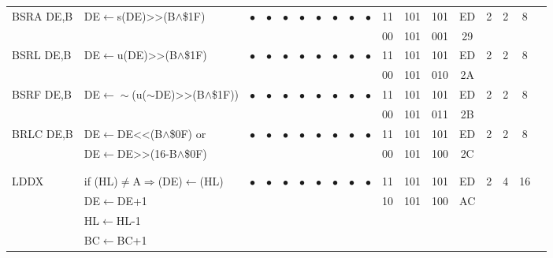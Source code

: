 \documentclass[oneside,a4paper]{book}
\newcommand{\instrt}{\rule{0pt}{2.7ex}}
\newcommand{\instrb}{\rule[-1.7ex]{0pt}{0pt}}
\begin{document}
{\begin{tabular}{llcccccccccccccccl}
		BSRA DE,B\footnotemark[1]\instrt & 
			DE$\leftarrow$s(DE)>>(B$\wedge$\$1F)\footnotemark[2] & 
			$\bullet$ & 
				$\bullet$ & 
				$\bullet$ & 
				$\bullet$ & 
				$\bullet$ & 
				$\bullet$ & 
				$\bullet$ & 
				$\bullet$ & 
			11 & 101 & 101 & 
			ED & 2 & 
			2 & 8 & \\
			\multicolumn{10}{c}{} & 00 & 101 & 001 & 29 & \instrb \\

		BSRL DE,B\footnotemark[1]\instrt & 
			DE$\leftarrow$u(DE)>>(B$\wedge$\$1F)\footnotemark[3] & 
			$\bullet$ & 
				$\bullet$ & 
				$\bullet$ & 
				$\bullet$ & 
				$\bullet$ & 
				$\bullet$ & 
				$\bullet$ & 
				$\bullet$ & 
			11 & 101 & 101 & 
			ED & 2 & 
			2 & 8 & \\
			\multicolumn{10}{c}{} & 00 & 101 & 010 & 2A & \instrb \\

		BSRF DE,B\footnotemark[1]\instrt & 
			DE$\leftarrow\sim$(u($\sim$DE)>>(B$\wedge$\$1F))\footnotemark[4] & 
			$\bullet$ & 
				$\bullet$ & 
				$\bullet$ & 
				$\bullet$ & 
				$\bullet$ & 
				$\bullet$ & 
				$\bullet$ & 
				$\bullet$ & 
			11 & 101 & 101 & 
			ED & 2 & 
			2 & 8 & \\
			\multicolumn{10}{c}{} & 00 & 101 & 011 & 2B & \instrb \\
			
		BRLC DE,B\footnotemark[1]\instrt & 
			DE$\leftarrow$DE<<(B$\wedge$\$0F) or & 
			$\bullet$ & 
				$\bullet$ & 
				$\bullet$ & 
				$\bullet$ & 
				$\bullet$ & 
				$\bullet$ & 
				$\bullet$ & 
				$\bullet$ & 
			11 & 101 & 101 & 
			ED & 2 & 
			2 & 8 & \\
			& DE$\leftarrow$DE>>(16-B$\wedge$\$0F) & \multicolumn{8}{c}{} & 00 & 101 & 100 & 2C & \instrb \\

		& & & & & & & & & & & & & & & & & \\
		& & & & & & & & & & & & & & & & & \\
	
		LDDX\instrt & 
			if (HL)$\neq$A$\Rightarrow$(DE)$\leftarrow$(HL) & 
			$\bullet$ & 
				$\bullet$ & 
				$\bullet$ & 
				$\bullet$ & 
				$\bullet$ & 
				$\bullet$ & 
				$\bullet$ & 
				$\bullet$ & 
			11 & 101 & 101 & 
			ED & 2 & 
			4 & 16 & \\
			& DE$\leftarrow$DE+1 & \multicolumn{8}{c}{} & 10 & 101 & 100 & AC & \\
			& HL$\leftarrow$HL-1 & \\
			& BC$\leftarrow$BC+1 & \instrb \\
	

\end{tabular}}
\end{document}
